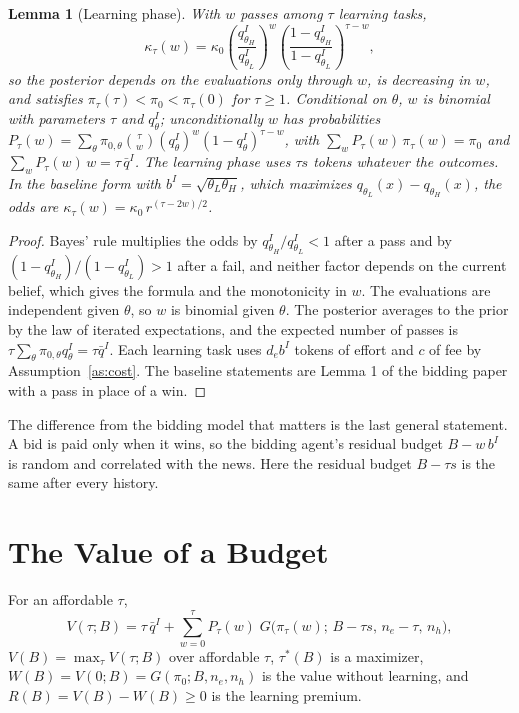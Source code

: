 \documentclass[11pt]{article}
\newtheorem{lemma}{Lemma}
\theoremstyle{definition}
\begin{document}
\begin{lemma}[Learning phase]\label{lem:learn}
With $w$ passes among $\tau$ learning tasks,
\[
\kappa_\tau(w)=\kappa_0\left(\frac{q_{\theta_H}^I}{q_{\theta_L}^I}\right)^{w}\left(\frac{1-q_{\theta_H}^I}{1-q_{\theta_L}^I}\right)^{\tau-w},
\]
so the posterior depends on the evaluations only through $w$, is decreasing in $w$, and satisfies $\pi_\tau(\tau)<\pi_0<\pi_\tau(0)$ for $\tau\ge1$. Conditional on $\theta$, $w$ is binomial with parameters $\tau$ and $q_\theta^I$; unconditionally $w$ has probabilities $P_\tau(w)=\sum_\theta\pi_{0,\theta}\binom{\tau}{w}(q_\theta^I)^w(1-q_\theta^I)^{\tau-w}$, with $\sum_w P_\tau(w)\,\pi_\tau(w)=\pi_0$ and $\sum_w P_\tau(w)\,w=\tau\,\bar q^I$. The learning phase uses $\tau s$ tokens whatever the outcomes. In the baseline form with $b^I=\sqrt{\theta_L\theta_H}$, which maximizes $q_{\theta_L}(x)-q_{\theta_H}(x)$, the odds are $\kappa_\tau(w)=\kappa_0\,r^{(\tau-2w)/2}$.
\end{lemma}

\begin{proof}
Bayes' rule multiplies the odds by $q_{\theta_H}^I/q_{\theta_L}^I<1$ after a pass and by $(1-q_{\theta_H}^I)/(1-q_{\theta_L}^I)>1$ after a fail, and neither factor depends on the current belief, which gives the formula and the monotonicity in $w$. The evaluations are independent given $\theta$, so $w$ is binomial given $\theta$. The posterior averages to the prior by the law of iterated expectations, and the expected number of passes is $\tau\sum_\theta\pi_{0,\theta}q_\theta^I=\tau\bar q^I$. Each learning task uses $d_e b^I$ tokens of effort and $c$ of fee by Assumption~\ref{as:cost}. The baseline statements are Lemma 1 of the bidding paper with a pass in place of a win.
\end{proof}

The difference from the bidding model that matters is the last general statement. A bid is paid only when it wins, so the bidding agent's residual budget $B-w\,b^I$ is random and correlated with the news. Here the residual budget $B-\tau s$ is the same after every history.

\section{The Value of a Budget}

For an affordable $\tau$,
\begin{equation}\label{eq:V}
V(\tau;B)=\tau\,\bar q^I+\sum_{w=0}^{\tau}P_\tau(w)\;G\bigl(\pi_\tau(w);\,B-\tau s,\,n_e-\tau,\,n_h\bigr),
\end{equation}
$V(B)=\max_\tau V(\tau;B)$ over affordable $\tau$, $\tau^*(B)$ is a maximizer, $W(B)=V(0;B)=G(\pi_0;B,n_e,n_h)$ is the value without learning, and $R(B)=V(B)-W(B)\ge0$ is the learning premium.
\end{document}
